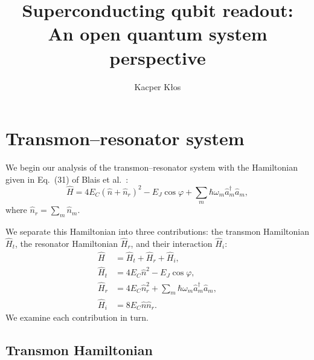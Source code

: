 \documentclass[11pt,a4paper]{article}
\title{Superconducting qubit readout:\\[0.3em]
  \large An open quantum system perspective}
\author{Kacper Kłos}
\date{}
\numberwithin{equation}{section}
\begin{document}
\maketitle
\thispagestyle{plain}

\section{Transmon--resonator system}

We begin our analysis of the transmon--resonator system with the Hamiltonian
given in Eq.~(31) of Blais et al.~\cite{Blais2021}:
\begin{equation}
  \hat H = 4E_C(\hat n+\hat n_r)^2-E_J\cos\varphi +\sum_m\hbar\omega_m\hat a_m^\dagger\hat a_m,
\end{equation}
where $\hat n_r=\sum_m\hat n_m$.

We separate this Hamiltonian into three contributions: the transmon
Hamiltonian $\hat H_t$, the resonator Hamiltonian $\hat H_r$, and their
interaction $\hat H_i$:
\begin{align}
  \hat H   &= \hat H_t+\hat H_r+\hat H_i, \\
  \hat H_t &= 4E_C\hat n^2-E_J\cos\varphi, \\
  \hat H_r &= 4E_C\hat n_r^2 +\sum_m\hbar\omega_m\hat a_m^\dagger\hat a_m, \\
  \hat H_i &= 8E_C\hat n\hat n_r.
\end{align}
We examine each contribution in turn.

\subsection{Transmon Hamiltonian}
\end{document}
